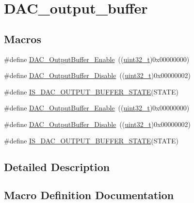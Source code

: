 \hypertarget{group___d_a_c__output__buffer}{}\section{D\+A\+C\+\_\+output\+\_\+buffer}
\label{group___d_a_c__output__buffer}
\subsection*{Macros}
\begin{DoxyCompactItemize}
\item 
\#define \hyperlink{group___d_a_c__output__buffer_gab3f92803a8b6bc5fb3e4859908b5161f}{D\+A\+C\+\_\+\+Output\+Buffer\+\_\+\+Enable}~((\hyperlink{_p_e___types_8h_a33594304e786b158f3fb30289278f5af}{uint32\+\_\+t})0x00000000)
\item 
\#define \hyperlink{group___d_a_c__output__buffer_gad41f919d7141398cfdedf8218ce64450}{D\+A\+C\+\_\+\+Output\+Buffer\+\_\+\+Disable}~((\hyperlink{_p_e___types_8h_a33594304e786b158f3fb30289278f5af}{uint32\+\_\+t})0x00000002)
\item 
\#define \hyperlink{group___d_a_c__output__buffer_gaa5a56816d641129fb62d11133c9dcccd}{I\+S\+\_\+\+D\+A\+C\+\_\+\+O\+U\+T\+P\+U\+T\+\_\+\+B\+U\+F\+F\+E\+R\+\_\+\+S\+T\+A\+TE}(S\+T\+A\+TE)
\item 
\#define \hyperlink{group___d_a_c__output__buffer_gab3f92803a8b6bc5fb3e4859908b5161f}{D\+A\+C\+\_\+\+Output\+Buffer\+\_\+\+Enable}~((\hyperlink{_p_e___types_8h_a33594304e786b158f3fb30289278f5af}{uint32\+\_\+t})0x00000000)
\item 
\#define \hyperlink{group___d_a_c__output__buffer_gad41f919d7141398cfdedf8218ce64450}{D\+A\+C\+\_\+\+Output\+Buffer\+\_\+\+Disable}~((\hyperlink{_p_e___types_8h_a33594304e786b158f3fb30289278f5af}{uint32\+\_\+t})0x00000002)
\item 
\#define \hyperlink{group___d_a_c__output__buffer_gaa5a56816d641129fb62d11133c9dcccd}{I\+S\+\_\+\+D\+A\+C\+\_\+\+O\+U\+T\+P\+U\+T\+\_\+\+B\+U\+F\+F\+E\+R\+\_\+\+S\+T\+A\+TE}(S\+T\+A\+TE)
\end{DoxyCompactItemize}


\subsection{Detailed Description}


\subsection{Macro Definition Documentation}
